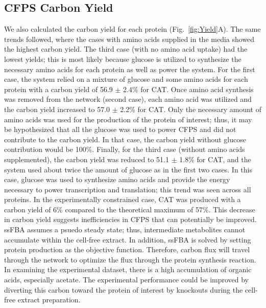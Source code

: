 \documentclass[journal=asbcd6,manuscript=article]{achemso}
\begin{document}
\subsection{CFPS Carbon Yield}
We also calculated the carbon yield for each protein (Fig.~\ref{fig:Yield}A).
The same trends followed, where the cases with amino acids supplied in the media showed the highest carbon yield.
The third case (with no amino acid uptake) had the lowest yields; this is most likely because glucose is utilized to synthesize the necessary amino acids for each protein as well as power the system.
For the first case, the system relied on a mixture of glucose and some amino acids for each protein with a carbon yield of 56.9 $\pm$ 2.4\% for CAT.
Once amino acid synthesis was removed from the network (second case), each amino acid was utilized and the carbon yield increased to 57.0 $\pm$ 2.2\% for CAT.
Only the necessary amount of amino acids was used for the production of the protein of interest; thus, it may be hypothesized that all the glucose was used to power CFPS and did not contribute to the carbon yield.
In that case, the carbon yield without glucose contribution would be 100\%.
Finally, for the third case (without amino acids supplemented), the carbon yield was reduced to 51.1 $\pm$ 1.8\% for CAT, and the system used about twice the amount of glucose as in the first two cases.
In this case, glucose was used to synthesize amino acids and provide the energy necessary to power transcription and translation; this trend was seen across all proteins.
In the experimentally constrained case, CAT was produced with a carbon yield of 6\% compared to the theoretical maximum of 57\%.
This decrease in carbon yield suggests inefficiencies in CFPS that can potentially be improved.
ssFBA assumes a psuedo steady state; thus, intermediate metabolites cannot accumulate within the cell-free extract.
In addition, ssFBA is solved by setting protein production as the objective function.
Therefore, carbon flux will travel through the network to optimize the flux through the protein synthesis reaction.
In examining the experimental dataset, there is a high accumulation of organic acids, especially acetate.
The experimental performance could be improved by diverting this carbon toward the protein of interest by knockouts during the cell-free extract preparation.    
\end{document}
